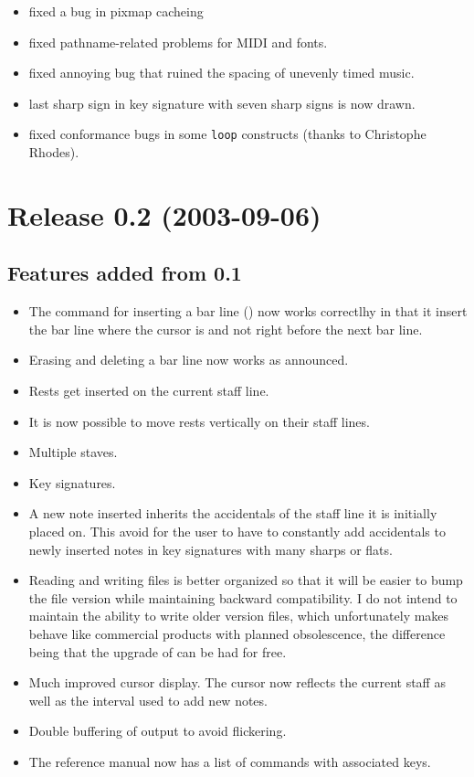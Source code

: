 \begin{itemize}
\item fixed a bug in pixmap cacheing
\item fixed pathname-related problems for MIDI and fonts. 
\item fixed annoying bug that ruined the spacing of unevenly timed
  music. 
\item last sharp sign in key signature with seven sharp signs is now
  drawn. 
\item fixed conformance bugs in some \texttt{loop} constructs (thanks to
  Christophe Rhodes).
\end{itemize}

\section{Release 0.2 (2003-09-06)}

\subsection{Features added from 0.1}

\begin{itemize}
\item The command for inserting a bar line (\kbd{|}) now works
  correctlhy in that it insert the bar line where the cursor is and
  not right before the next bar line.
\item Erasing and deleting a bar line now works as announced.
\item Rests get inserted on the current staff line. 
\item It is now possible to move rests vertically on their staff
  lines. 
\item Multiple staves.
\item Key signatures.
\item A new note inserted inherits the accidentals of the staff line
  it is initially placed on.  This avoid for the user to have to
  constantly add accidentals to newly inserted notes in key signatures
  with many sharps or flats.
\item Reading and writing {\gs} files is better organized so that it
  will be easier to bump the file version while maintaining backward
  compatibility.  I do not intend to maintain the ability to write
  older version files, which unfortunately makes {\gs} behave like
  commercial products with planned obsolescence, the difference being
  that the upgrade of {\gs} can be had for free.
\item Much improved cursor display.  The cursor now reflects the
  current staff as well as the interval used to add new notes.
\item Double buffering of output to avoid flickering.
\item The reference manual now has a list of commands with associated
  keys. 
\end{itemize}


